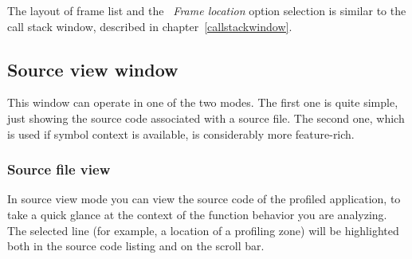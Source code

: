 \documentclass[hidelinks,titlepage,a4paper]{article}
\begin{document}
The layout of frame list and the \emph{\faAt{}~Frame location} option selection is similar to the call stack window, described in chapter~\ref{callstackwindow}.

\subsection{Source view window}
\label{sourceview}

This window can operate in one of the two modes. The first one is quite simple, just showing the source code associated with a source file. The second one, which is used if symbol context is available, is considerably more feature-rich.

\subsubsection{Source file view}

In source view mode you can view the source code of the profiled application, to take a quick glance at the context of the function behavior you are analyzing. The selected line (for example, a location of a profiling zone) will be highlighted both in the source code listing and on the scroll bar.
\end{document}
